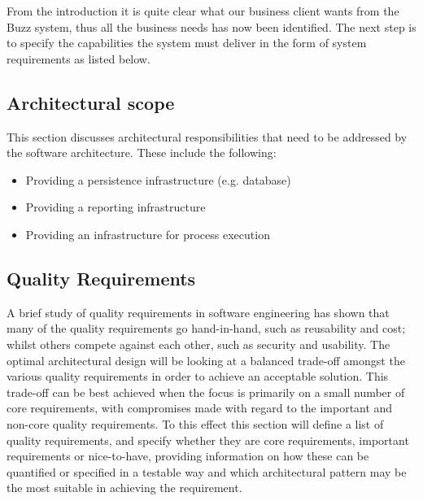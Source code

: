 \documentclass[a4paper]{article}
\begin{document}
From the introduction it is quite clear what our business client wants from the Buzz system, thus all the business needs has now been identified. The next step is to specify the capabilities the system must deliver in the form of system requirements as listed  below. 

\subsection{Architectural scope}
This section discusses architectural responsibilities that need to be addressed by the software
architecture. These include the following:

\begin{itemize}
\item Providing a persistence infrastructure (e.g. database)
\item Providing a reporting infrastructure
\item Providing an infrastructure for process execution
\end{itemize}

\subsection{Quality Requirements}
A brief study of quality requirements in software engineering has shown that many of the quality requirements go hand-in-hand, such as reusability and cost; whilst others compete against each other, such as security and usability. The optimal architectural design will be looking at a balanced trade-off amongst the various quality requirements in order to achieve an acceptable solution.  This trade-off can be best achieved when the focus is primarily on a small number of core requirements, with compromises made with regard to the important and non-core quality requirements. To this effect this section will define a list of quality requirements, and specify whether they are core requirements, important requirements or nice-to-have, providing information on how these can be quantified or specified in a testable way and which architectural pattern may be the most suitable in achieving the requirement.
\end{document}
